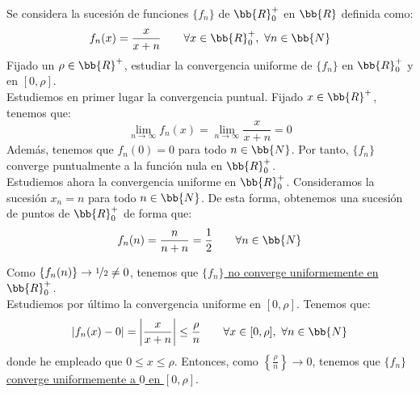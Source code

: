 \begin{ejercicio}
    Se considera la sucesión de funciones $\{f_n\}$ de $\bb{R}^+_0$ en $\bb{R}$ definida como:
    \begin{equation*}
        f_n(x) = \frac{x}{x+n} \qquad \forall x\in \bb{R}^+_0,~\forall n\in \bb{N}
    \end{equation*}
    Fijado un $\rho\in \bb{R}^+$, estudiar la convergencia uniforme de $\{f_n\}$ en $\bb{R}_0^+$ y en $[0,\rho]$.\\

    Estudiemos en primer lugar la convergencia puntual. Fijado $x\in \bb{R}^+$, tenemos que:
    \begin{equation*}
        \lim_{n\to \infty} f_n(x) = \lim_{n\to \infty} \frac{x}{x+n} = 0
    \end{equation*}
    Además, tenemos que $f_n(0)=0$ para todo $n\in \bb{N}$. Por tanto, $\{f_n\}$ converge puntualmente a la función nula en $\bb{R}^+_0$.\\
    
    Estudiemos ahora la convergencia uniforme en $\bb{R}^+_0$. Consideramos la sucesión $x_n=n$ para todo $n\in \bb{N}$. De esta forma, obtenemos una sucesión de puntos de $\bb{R}^+_0$ de forma que:
    \begin{equation*}
        f_n(n) = \frac{n}{n+n} = \frac{1}{2} \qquad \forall n\in \bb{N}
    \end{equation*}

    Como $\{f_n(n)\}\to \nicefrac{1}{2}\neq 0$, tenemos que \ul{$\{f_n\}$ no converge uniformemente en $\bb{R}^+_0$}.\\

    Estudiemos por último la convergencia uniforme en $[0,\rho]$. Tenemos que:
    \begin{equation*}
        \left|f_n(x)-0\right| = \left|\frac{x}{x+n}\right| \leq \frac{\rho}{n} \qquad \forall x\in [0,\rho],~\forall n\in \bb{N}
    \end{equation*}
    donde he empleado que $0\leq x\leq \rho$. Entonces, como $\left\{\frac{\rho}{n}\right\}\to 0$, tenemos que \ul{$\{f_n\}$ converge uniformemente a $0$ en $[0,\rho]$}.
\end{ejercicio}


